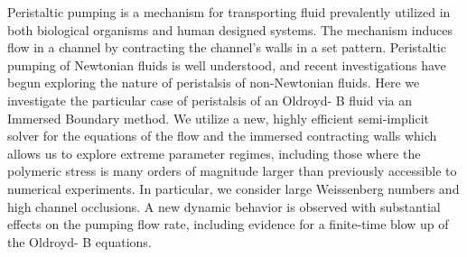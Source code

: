 Peristaltic pumping is a mechanism for transporting fluid prevalently utilized in both biological organisms and human designed systems. The mechanism induces flow in a channel by contracting the channel's walls in a set pattern. Peristaltic pumping of Newtonian fluids is well understood, and recent investigations have begun exploring the nature of peristalsis of non-Newtonian fluids. Here we investigate the particular case of peristalsis of an Oldroyd- B fluid via an Immersed Boundary method. We utilize a new, highly efficient semi-implicit solver for the equations of the flow and the immersed contracting walls which allows us to explore extreme parameter regimes, including those where the polymeric stress is many orders of magnitude larger than previously accessible to numerical experiments. In particular,  we consider large Weissenberg numbers and high channel occlusions. A new dynamic behavior is observed with substantial effects on the pumping flow rate, including evidence for a finite-time blow up of the Oldroyd- B equations.
